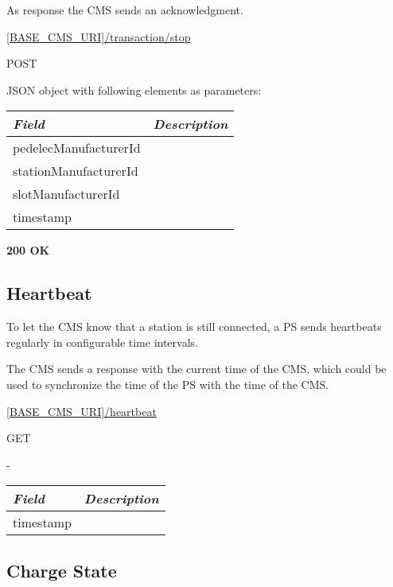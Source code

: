 As response the \acs{CMS} sends an acknowledgment.

 \url{[BASE_CMS_URI]/transaction/stop}

 POST

JSON object with following elements as parameters:\\
\begin{tabularx}{\linewidth}{ | l | X | }
  \hline
  \textit{Field} & \textit{Description} \\
  \hline \hline
  	pedelecManufacturerId			& \\
  	stationManufacturerId			& \\
  	slotManufacturerId			& \\
  	timestamp					& \\
  	
    \hline
\end{tabularx}

\textbf{200 OK}\\

\subsection{Heartbeat}

To let the \acs{CMS} know that a station is still connected, a \acs{PS} sends heartbeats regularly in configurable time intervals.

The \acs{CMS} sends a response with the current time of the \acs{CMS}, which could be used to synchronize the time of the \acs{PS} with the time of the \acs{CMS}.

 \url{[BASE_CMS_URI]/heartbeat}

 GET

-

\begin{tabularx}{\linewidth}{ | l | X | }
  \hline
  \textit{Field} & \textit{Description} \\
  \hline \hline
  	timestamp					& \\
  	
    \hline
\end{tabularx}

\subsection{Charge State}
\label{ps:charge-state}


